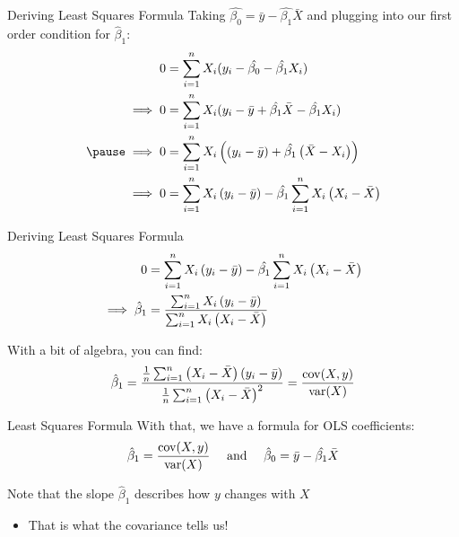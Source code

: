 \documentclass[aspectratio=169,t,11pt,table]{beamer}
\begin{document}
\begin{frame}{Deriving Least Squares Formula}
  Taking $\hat{\beta_0} = \bar{y} - \hat{\beta_1} \bar{X}$ and plugging into our first order condition for $\hat{\beta}_1$:
  \begin{align*}
    0 &= \sum_{i=1}^n X_i (y_i - \hat{\beta_0} - \hat{\beta_1} X_i) \\
    \implies 0 &= \sum_{i=1}^n X_i (y_i - \bar{y} + \hat{\beta_1} \bar{X} - \hat{\beta_1} X_i) \\
    \pause
    \implies 0 &= \sum_{i=1}^n X_i \left( \left( y_i - \bar{y} \right) + \hat{\beta_1} \left( \bar{X} - X_i \right) \right) \\
    \implies 0 &= \sum_{i=1}^n X_i \left( y_i - \bar{y} \right) - \hat{\beta_1} \sum_{i=1}^n X_i \left( X_i - \bar{X} \right) \\
  \end{align*}
\end{frame}

\begin{frame}{Deriving Least Squares Formula}
  \begin{align*}
    0 &= \sum_{i=1}^n X_i \left( y_i - \bar{y} \right) - \hat{\beta_1} \sum_{i=1}^n X_i \left( X_i - \bar{X} \right) \\
    \smallskip
    \implies \hat{\beta}_1 &= \frac{\sum_{i=1}^n X_i \left( y_i - \bar{y} \right)}{\sum_{i=1}^n X_i \left( X_i - \bar{X} \right)}
  \end{align*}

  With a bit of algebra, you can find:
  \begin{align*}
    \hat{\beta}_1 = \frac{\frac{1}{n} \sum_{i=1}^n \left( X_i - \bar{X} \right) \left( y_i - \bar{y} \right)}{\frac{1}{n} \sum_{i=1}^n \left( X_i - \bar{X} \right)^2} = \frac{\cov(X, y)}{\var(X)}
  \end{align*} 
\end{frame}

\begin{frame}{Least Squares Formula}
  With that, we have a formula for OLS coefficients:
  $$
    \hat{\beta}_1 = \frac{\cov(X, y)}{\var(X)} \quad\text{ and }\quad \hat{\beta}_0 = \bar{y} - \hat{\beta_1} \bar{X}
  $$

  \pause
  \bigskip
  Note that the slope $\hat{\beta}_1$ describes how $y$ changes with $X$
  \begin{itemize}
    \item That is what the covariance tells us!
  \end{itemize}
\end{frame}
\end{document}
